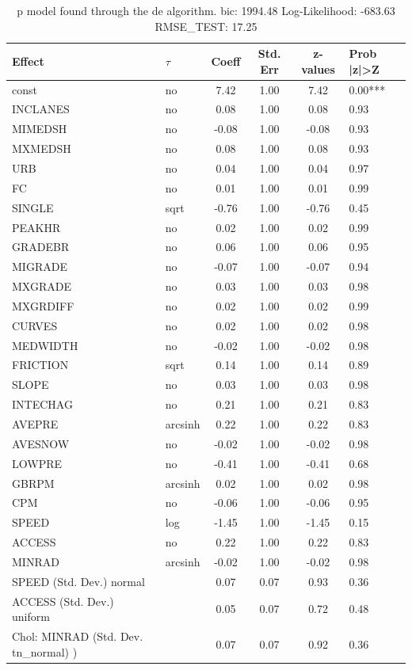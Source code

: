 \begin{table}
	\caption{p model found through the de algorithm. bic: 1994.48 Log-Likelihood: -683.63 RMSE_TEST: 17.25}
	\begin{center}
		\begin{tabular}{|l|l|c|c|c|l|}
			\hline
			Effect & $\tau$ & Coeff & Std. Err & z-values & Prob |z|>Z \\
			\hline
			const & no & 7.42 & 1.00 & 7.42 & 0.00*** \\
			\hline
			INCLANES & no & 0.08 & 1.00 & 0.08 & 0.93 \\
			\hline
			MIMEDSH & no & -0.08 & 1.00 & -0.08 & 0.93 \\
			\hline
			MXMEDSH & no & 0.08 & 1.00 & 0.08 & 0.93 \\
			\hline
			URB & no & 0.04 & 1.00 & 0.04 & 0.97 \\
			\hline
			FC & no & 0.01 & 1.00 & 0.01 & 0.99 \\
			\hline
			SINGLE & sqrt & -0.76 & 1.00 & -0.76 & 0.45 \\
			\hline
			PEAKHR & no & 0.02 & 1.00 & 0.02 & 0.99 \\
			\hline
			GRADEBR & no & 0.06 & 1.00 & 0.06 & 0.95 \\
			\hline
			MIGRADE & no & -0.07 & 1.00 & -0.07 & 0.94 \\
			\hline
			MXGRADE & no & 0.03 & 1.00 & 0.03 & 0.98 \\
			\hline
			MXGRDIFF & no & 0.02 & 1.00 & 0.02 & 0.99 \\
			\hline
			CURVES & no & 0.02 & 1.00 & 0.02 & 0.98 \\
			\hline
			MEDWIDTH & no & -0.02 & 1.00 & -0.02 & 0.98 \\
			\hline
			FRICTION & sqrt & 0.14 & 1.00 & 0.14 & 0.89 \\
			\hline
			SLOPE & no & 0.03 & 1.00 & 0.03 & 0.98 \\
			\hline
			INTECHAG & no & 0.21 & 1.00 & 0.21 & 0.83 \\
			\hline
			AVEPRE & arcsinh & 0.22 & 1.00 & 0.22 & 0.83 \\
			\hline
			AVESNOW & no & -0.02 & 1.00 & -0.02 & 0.98 \\
			\hline
			LOWPRE & no & -0.41 & 1.00 & -0.41 & 0.68 \\
			\hline
			GBRPM & arcsinh & 0.02 & 1.00 & 0.02 & 0.98 \\
			\hline
			CPM & no & -0.06 & 1.00 & -0.06 & 0.95 \\
			\hline
			SPEED & log & -1.45 & 1.00 & -1.45 & 0.15 \\
			\hline
			ACCESS & no & 0.22 & 1.00 & 0.22 & 0.83 \\
			\hline
			MINRAD & arcsinh & -0.02 & 1.00 & -0.02 & 0.98 \\
			\hline
			SPEED (Std. Dev.) normal &  & 0.07 & 0.07 & 0.93 & 0.36 \\
			\hline
			ACCESS (Std. Dev.) uniform &  & 0.05 & 0.07 & 0.72 & 0.48 \\
			\hline
			 Chol: MINRAD (Std. Dev. tn_normal) ) &  & 0.07 & 0.07 & 0.92 & 0.36 \\
			\hline
		\end{tabular}
	\end{center}
\end{table}